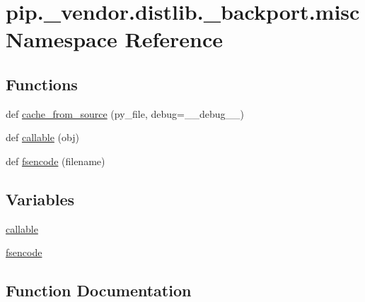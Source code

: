 \hypertarget{namespacepip_1_1__vendor_1_1distlib_1_1__backport_1_1misc}{}\section{pip.\+\_\+vendor.\+distlib.\+\_\+backport.\+misc Namespace Reference}
\label{namespacepip_1_1__vendor_1_1distlib_1_1__backport_1_1misc}
\subsection*{Functions}
\begin{DoxyCompactItemize}
\item 
def \hyperlink{namespacepip_1_1__vendor_1_1distlib_1_1__backport_1_1misc_a508941112e68de1844f89fee14b2e40a}{cache\+\_\+from\+\_\+source} (py\+\_\+file, debug=\+\_\+\+\_\+debug\+\_\+\+\_\+)
\item 
def \hyperlink{namespacepip_1_1__vendor_1_1distlib_1_1__backport_1_1misc_a7ca11c251c1c5300a82328482d91135d}{callable} (obj)
\item 
def \hyperlink{namespacepip_1_1__vendor_1_1distlib_1_1__backport_1_1misc_a5201887518d00d1f3dd81e0e4cd8b124}{fsencode} (filename)
\end{DoxyCompactItemize}
\subsection*{Variables}
\begin{DoxyCompactItemize}
\item 
\hyperlink{namespacepip_1_1__vendor_1_1distlib_1_1__backport_1_1misc_ab5053589c1cfc86e0c549ca6d1c72f61}{callable}
\item 
\hyperlink{namespacepip_1_1__vendor_1_1distlib_1_1__backport_1_1misc_a9dfb7caf486366ff3b62eb4a03f54a07}{fsencode}
\end{DoxyCompactItemize}


\subsection{Function Documentation}
\mbox{\label{namespacepip_1_1__vendor_1_1distlib_1_1__backport_1_1misc_a508941112e68de1844f89fee14b2e40a}} 
